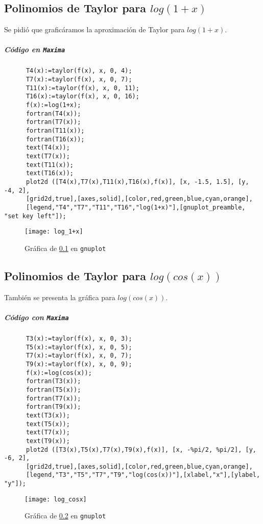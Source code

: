 \documentclass[a4paper]{article}
\begin{document}
  \subsection{Polinomios de Taylor para $log(1+x)$}
  \label{2}
  	Se pidió que graficáramos la aproximación de Taylor para $log(1+x)$.
  
  	\subparagraph{Código en \texttt{Maxima}}
      \begin{verbatim}
      T4(x):=taylor(f(x), x, 0, 4);
      T7(x):=taylor(f(x), x, 0, 7);
      T11(x):=taylor(f(x), x, 0, 11);
      T16(x):=taylor(f(x), x, 0, 16);
      f(x):=log(1+x);
      fortran(T4(x));
      fortran(T7(x));
      fortran(T11(x));
      fortran(T16(x));
      text(T4(x));
      text(T7(x));
      text(T11(x));
      text(T16(x));
      plot2d ([T4(x),T7(x),T11(x),T16(x),f(x)], [x, -1.5, 1.5], [y, -4, 2],
      [grid2d,true],[axes,solid],[color,red,green,blue,cyan,orange], 
      [legend,"T4","T7","T11","T16","log(1+x)"],[gnuplot_preamble, "set key left"]);
      \end{verbatim}
  
      \begin{figure}[H]
        \centering
        \texttt{[image: log\_1+x]}
        \caption{Gráfica de \ref{2} en \texttt{gnuplot}}
      \end{figure}
    
  \subsection{Polinomios de Taylor para $log(cos(x))$}
  \label{3}
  	También se presenta la gráfica para $log(cos(x))$.
    
    \subparagraph{Código con \texttt{Maxima}}
      \begin{verbatim}
      T3(x):=taylor(f(x), x, 0, 3);
      T5(x):=taylor(f(x), x, 0, 5);
      T7(x):=taylor(f(x), x, 0, 7);
      T9(x):=taylor(f(x), x, 0, 9);
      f(x):=log(cos(x));
      fortran(T3(x));
      fortran(T5(x));
      fortran(T7(x));
      fortran(T9(x));
      text(T3(x));
      text(T5(x));
      text(T7(x));
      text(T9(x));
      plot2d ([T3(x),T5(x),T7(x),T9(x),f(x)], [x, -%pi/2, %pi/2], [y, -6, 2],
      [grid2d,true],[axes,solid],[color,red,green,blue,cyan,orange], 
      [legend,"T3","T5","T7","T9","log(cos(x))"],[xlabel,"x"],[ylabel, "y"]);
      \end{verbatim}
    
      \begin{figure}[H]
        \centering
        \texttt{[image: log\_cosx]}
        \caption{Gráfica de \ref{3} en \texttt{gnuplot}}
      \end{figure}
      
\end{document}
